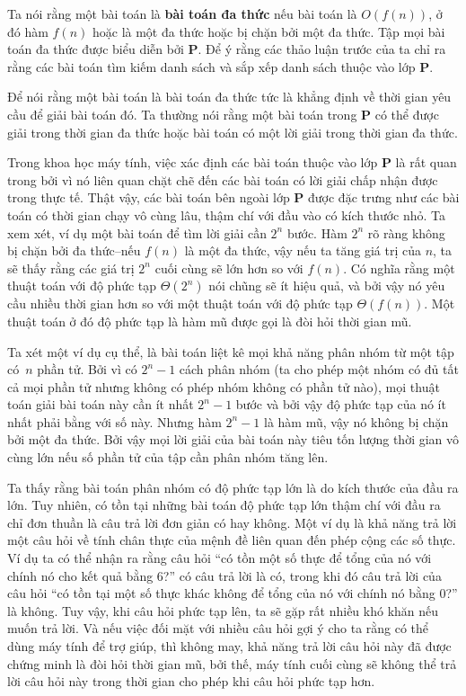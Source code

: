 Ta nói rằng một bài toán là \textbf{bài toán đa thức} nếu bài toán là $O(f(n))$, ở đó hàm
$f(n)$ hoặc là một đa thức hoặc bị chặn bởi một đa thức. Tập mọi bài toán đa thức được
biểu diễn bởi $\mathbf{P}$. Để ý rằng các thảo luận trước của ta chỉ ra rằng các bài toán
tìm kiếm danh sách và sắp xếp danh sách thuộc vào lớp $\mathbf{P}$.

Để nói rằng một bài toán là bài toán đa thức tức là khẳng định về thời gian yêu cầu để
giải bài toán đó. Ta thường nói rằng một bài toán trong $\mathbf{P}$ có thể được giải
trong thời gian đa thức hoặc bài toán có một lời giải trong thời gian đa thức.

Trong khoa học máy tính, việc xác định các bài toán thuộc vào lớp $\mathbf{P}$ là rất quan
trong bởi vì nó liên quan chặt chẽ đến các bài toán có lời giải chấp nhận được trong thực
tế. Thật vậy, các bài toán bên ngoài lớp $\mathbf{P}$ được đặc trưng như các bài toán có
thời gian chạy vô cùng lâu, thậm chí với đầu vào có kích thước nhỏ. Ta xem xét, ví dụ một
bài toán để tìm lời giải cần $2^n$ bước. Hàm $2^n$ rõ ràng không bị chặn bởi đa thức--nếu
$f(n)$ là một đa thức, vậy nếu ta tăng giá trị của $n$, ta sẽ thấy rằng các giá trị $2^n$
cuối cùng sẽ lớn hơn so với $f(n)$. Có nghĩa rằng một thuật toán với độ phức tạp
$\Theta(2^n)$ nói chũng sẽ ít hiệu quả, và bởi vậy nó yêu cầu nhiều thời gian hơn so với
một thuật toán với độ phức tạp $\Theta(f(n))$. Một thuật toán ở đó độ phức tạp là hàm mũ
được gọi là đòi hỏi thời gian mũ.

Ta xét một ví dụ cụ thể, là bài toán liệt kê mọi khả năng phân nhóm từ một tập có~$n$ phần
tử. Bởi vì có $2^n - 1$ cách phân nhóm (ta cho phép một nhóm có đủ tất cả mọi phần tử
nhưng không có phép nhóm không có phần tử nào), mọi thuật toán giải bài toán này cần ít
nhất $2^n - 1$ bước và bởi vậy độ phức tạp của nó ít nhất phải bằng với số này. Nhưng hàm
$2^n -1$ là hàm mũ, vậy nó không bị chặn bởi một đa thức. Bởi vậy mọi lời giải của bài
toán này tiêu tốn lượng thời gian vô cùng lớn nếu số phần tử của tập cần phân nhóm tăng
lên.

Ta thấy rằng bài toán phân nhóm có độ phức tạp lớn là do kích thước của đầu ra lớn. Tuy
nhiên, có tồn tại những bài toán độ phức tạp lớn thậm chí với đầu ra chỉ đơn thuần là câu
trả lời đơn giản có hay không. Một ví dụ là khả năng trả lời một câu hỏi về tính chân thực
của mệnh đề liên quan đến phép cộng các số thực. Ví dụ ta có thể nhận ra rằng câu hỏi ``có
tồn một số thực để tổng của nó với chính nó cho kết quả bằng $6$?'' có câu trả lời là có,
trong khi đó câu trả lời của câu hỏi ``có tồn tại một số thực khác không để tổng của nó
với chính nó bằng $0$?'' là không. Tuy vậy, khi câu hỏi phức tạp lên, ta sẽ gặp rất nhiều
khó khăn nếu muốn trả lời. Và nếu việc đối mặt với nhiều câu hỏi gợi ý cho ta rằng có thể
dùng máy tính để trợ giúp, thì không may, khả năng trả lời câu hỏi này đã được chứng minh
là đòi hỏi thời gian mũ, bởi thế, máy tính cuối cùng sẽ không thể trả lời câu hỏi này
trong thời gian cho phép khi câu hỏi phức tạp hơn.

